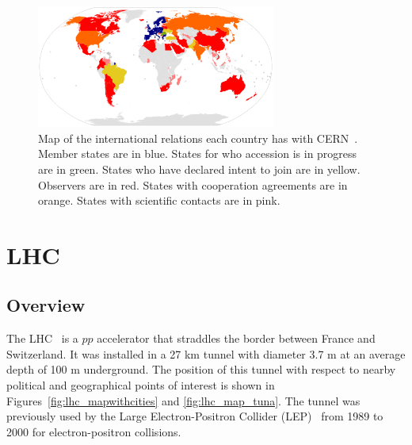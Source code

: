 \begin{figure}[ht]
 \begin{center}
    \includegraphics[width=0.70\textwidth]{figures/experiment/CERN_international_relations_map.pdf}
      \end{center}
\caption{Map of the international relations each country has with CERN~\cite{cern:map}.
Member states are in blue. States for who accession is in progress are in green.
States who have declared intent to join are in yellow. Observers are in red. States with
cooperation agreements are in orange. States with scientific contacts are in pink.
}
\label{fig:cernmembers}
\end{figure}


\section{LHC\label{sec:LHC}}
\subsection{Overview}
The LHC~\cite{cern-jinst-lhc} is a $pp$ accelerator that straddles the border between France and Switzerland. It was installed in a 27 km tunnel with diameter 3.7 m at an average depth of 100 m underground.
The position of this tunnel with respect to nearby political and geographical points of interest is 
shown in Figures~\ref{fig:lhc_mapwithcities} and \ref{fig:lhc_map_tuna}.
The tunnel was previously
used by the Large Electron-Positron Collider (LEP)~\cite{LEP_DR1979} from 1989 to 2000 for electron-positron collisions.

